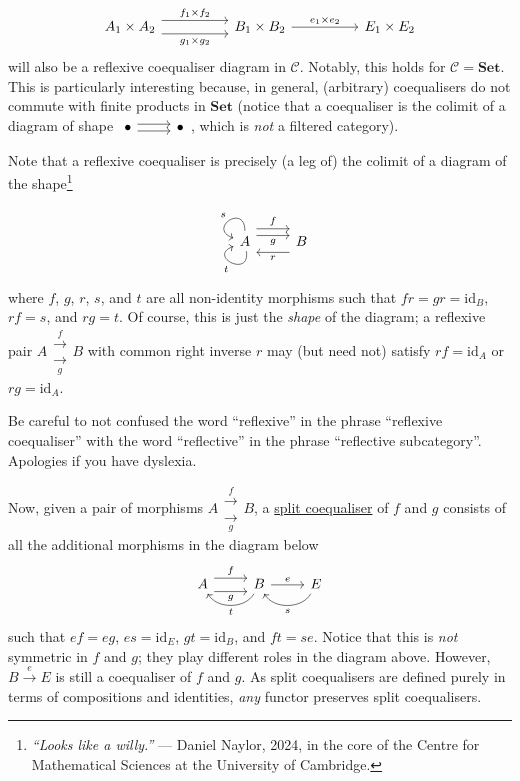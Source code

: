 \documentclass[a4paper,11pt]{article}
\theoremstyle{break_italics}
\theoremstyle{break_upright}
\theoremstyle{remark}
\newcommand{\id}{\mathrm{id}}
\newcommand{\C}{\mathcal{C}}
\newcommand{\Set}{\mathbf{Set}}
\begin{document}
\[
\begin{tikzcd}
A_1 \times A_2 \arrow[rr, "f_1 \times f_2", shift left=2] \arrow[rr, "g_1 \times g_2"', shift right=2] &  & B_1 \times B_2 \arrow[rr, "e_1 \times e_2"] &  & E_1 \times E_2
\end{tikzcd}
\]
will also be a reflexive coequaliser diagram in $\C$. Notably, this holds for $\C = \Set$. This is particularly interesting because, in general, (arbitrary) coequalisers do not commute with finite products in $\Set$ (notice that a coequaliser is the colimit of a diagram of shape $\begin{tikzcd}
	\bullet & \bullet
	\arrow[shift left, from=1-1, to=1-2]
	\arrow[shift right, from=1-1, to=1-2]
\end{tikzcd}$, which is \textit{not} a filtered category).

Note that a reflexive coequaliser is precisely (a leg of) the colimit of a diagram of the shape\footnote{\textit{``Looks like a willy.''} --- Daniel Naylor, 2024, in the core of the Centre for Mathematical Sciences at the University of Cambridge.}
\[
\begin{tikzcd}
A \arrow[r, "f", shift left=4] \arrow[r, "g"', shift left=2] \arrow["s"', loop, distance=2em, in=160, out=90] \arrow["t", loop, distance=2em, in=200, out=279] & B \arrow[l, "r", shift left=3]
\end{tikzcd}
\]
where $f$, $g$, $r$, $s$, and $t$ are all non-identity morphisms such that $fr = gr = \id_B$, $rf = s$, and $rg = t$. Of course, this is just the \textit{shape} of the diagram; a reflexive pair $A \substack{\xrightarrow{f} \\ \xrightarrow[g]{}} B$ with common right inverse $r$ may (but need not) satisfy $rf = \id_A$ or $rg = \id_A$.

Be careful to not confused the word ``reflexive'' in the phrase ``reflexive coequaliser'' with the word ``reflective'' in the phrase ``reflective subcategory''. Apologies if you have dyslexia.

Now, given a pair of morphisms $A \substack{\xrightarrow{f} \\ \xrightarrow[g]{}} B$, a \uline{split coequaliser} of $f$ and $g$ consists of all the additional morphisms in the diagram below
\[
\begin{tikzcd}
A \arrow[r, "f", shift left=2] \arrow[r, "g"', shift right=2] & B \arrow[l, "t", bend left=60] \arrow[r, "e"] & E \arrow[l, "s", bend left=60]
\end{tikzcd}
\]
such that $ef = eg$, $es = \id_E$, $gt = \id_B$, and $ft = se$. Notice that this is \textit{not} symmetric in $f$ and $g$; they play different roles in the diagram above. However, $B \xrightarrow{e} E$ is still a coequaliser of $f$ and $g$. As split coequalisers are defined purely in terms of compositions and identities, \textit{any} functor preserves split coequalisers.
\end{document}
